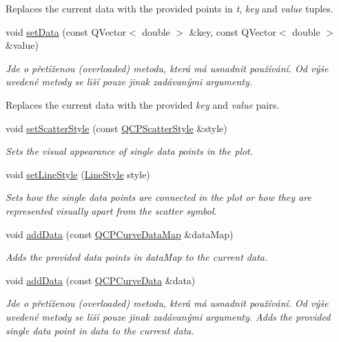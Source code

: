 \begin{DoxyCompactItemize}
\begin{DoxyCompactList}
Replaces the current data with the provided points in {\itshape t}, {\itshape key} and {\itshape value} tuples. \end{DoxyCompactList}\item 
void \hyperlink{classQCPCurve_a963d4c45777deef15848a8f56172d066}{set\+Data} (const Q\+Vector$<$ double $>$ \&key, const Q\+Vector$<$ double $>$ \&value)
\begin{DoxyCompactList}\small\item\em Jde o přetíženou (overloaded) metodu, která má usnadnit používání. Od výše uvedené metody se liší pouze jinak zadávanými argumenty.

Replaces the current data with the provided {\itshape key} and {\itshape value} pairs. \end{DoxyCompactList}\item 
void \hyperlink{classQCPCurve_a55e43b44709bf50a35500644988aa706}{set\+Scatter\+Style} (const \hyperlink{classQCPScatterStyle}{Q\+C\+P\+Scatter\+Style} \&style)
\begin{DoxyCompactList}\small\item\em Sets the visual appearance of single data points in the plot. \end{DoxyCompactList}\item 
void \hyperlink{classQCPCurve_a4a377ec863ff81a1875c3094a6177c19}{set\+Line\+Style} (\hyperlink{classQCPCurve_a2710e9f79302152cff794c6e16cc01f1}{Line\+Style} style)
\begin{DoxyCompactList}\small\item\em Sets how the single data points are connected in the plot or how they are represented visually apart from the scatter symbol. \end{DoxyCompactList}\item 
void \hyperlink{classQCPCurve_a4e24023c3b9ac75440c7a260172c99af}{add\+Data} (const \hyperlink{qcustomplot_8h_a444d37ec9cb2951b3a7fe443c34d1658}{Q\+C\+P\+Curve\+Data\+Map} \&data\+Map)
\begin{DoxyCompactList}\small\item\em Adds the provided data points in {\itshape data\+Map} to the current data. \end{DoxyCompactList}\item 
void \hyperlink{classQCPCurve_ad304326aba096911f92452d8bfe0470e}{add\+Data} (const \hyperlink{classQCPCurveData}{Q\+C\+P\+Curve\+Data} \&data)
\begin{DoxyCompactList}\small\item\em Jde o přetíženou (overloaded) metodu, která má usnadnit používání. Od výše uvedené metody se liší pouze jinak zadávanými argumenty. Adds the provided single data point in {\itshape data} to the current data. \end{DoxyCompactList}\item 

\end{DoxyCompactItemize}
